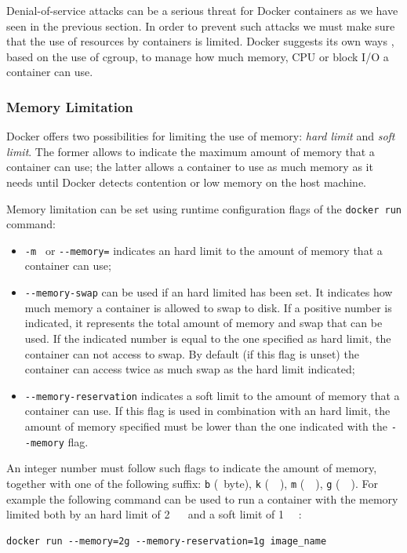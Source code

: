 \documentclass[a4paper,12pt]{article}
\newcommand{\code}[1]{\lstinline|#1|}
\begin{document}
Denial-of-service attacks can be a serious threat for Docker containers as we
have seen in the previous section. In order to prevent such attacks we must make
sure that the use of resources by containers is limited. Docker suggests its own
ways \cite{resource_on_docker}, based on the use of cgroup, to manage
how much memory, CPU or block I/O a container can use.

\subsubsection{Memory Limitation}

Docker offers two possibilities for limiting the use of memory: \textit{hard
limit} and \textit{soft limit}. The former allows to indicate the maximum amount
of memory that a container can use; the latter allows a container to
use as much memory as it needs until Docker detects contention or low memory on
the host machine. \par Memory limitation can be set using runtime configuration
flags of the \code{docker run} command: 
\begin{itemize}
  \item \code{-m } or \code{--memory=} indicates an hard limit to the amount
  of memory that a container can use;
  \item \code{--memory-swap} can be used if an hard limited has been set. It
  indicates how much memory a container is allowed to swap to disk. If a
  positive number is indicated, it represents the total amount of memory and
  swap that can be used. If the indicated number is equal to the one specified
  as hard limit, the container can not access to swap. By default (if this flag is
  unset) the container can access twice as much swap as the hard limit indicated;
  \item \code{--memory-reservation} indicates a soft limit to the amount
  of memory that a container can use. If this flag is used in combination with
  an hard limit, the amount of memory specified must be lower than the one
  indicated with the \code{--memory} flag.
\end{itemize}
An integer number must follow such flags to indicate the amount of memory,
together with one of the following suffix: \code{b} (\SI{}{byte}), \code{k}
(\SI{}{\kilo\byte}), \code{m} (\SI{}{\mega\byte}), \code{g} (\SI{}{\giga\byte}).
For example the following command can be used to run a container with the memory
limited both by an hard limit of 2 \SI{}{\giga\byte} and a soft limit of 1
\SI{}{\giga\byte}:
\begin{lstlisting}
docker run --memory=2g --memory-reservation=1g image_name
\end{lstlisting}
  
\end{document}
